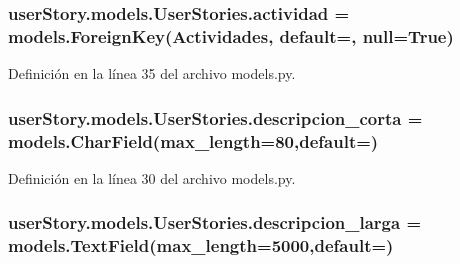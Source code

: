 \subsubsection[{\texorpdfstring{actividad}{actividad}}]{\setlength{\rightskip}{0pt plus 5cm}user\+Story.\+models.\+User\+Stories.\+actividad = models.\+Foreign\+Key({\bf Actividades}, default=\textquotesingle{}\textquotesingle{}, null=True)\hspace{0.3cm}{\ttfamily [static]}}\hypertarget{classuser_story_1_1models_1_1_user_stories_a589704713cc509199343a09d27f210e9}{}\label{classuser_story_1_1models_1_1_user_stories_a589704713cc509199343a09d27f210e9}


Definición en la línea 35 del archivo models.\+py.

\subsubsection[{\texorpdfstring{descripcion\+\_\+corta}{descripcion_corta}}]{\setlength{\rightskip}{0pt plus 5cm}user\+Story.\+models.\+User\+Stories.\+descripcion\+\_\+corta = models.\+Char\+Field(max\+\_\+length=80,default=\textquotesingle{}\textquotesingle{})\hspace{0.3cm}{\ttfamily [static]}}\hypertarget{classuser_story_1_1models_1_1_user_stories_a48ef4cf166f2feccd1728a8b68d89b7e}{}\label{classuser_story_1_1models_1_1_user_stories_a48ef4cf166f2feccd1728a8b68d89b7e}


Definición en la línea 30 del archivo models.\+py.

\subsubsection[{\texorpdfstring{descripcion\+\_\+larga}{descripcion_larga}}]{\setlength{\rightskip}{0pt plus 5cm}user\+Story.\+models.\+User\+Stories.\+descripcion\+\_\+larga = models.\+Text\+Field(max\+\_\+length=5000,default=\textquotesingle{}\textquotesingle{})\hspace{0.3cm}{\ttfamily [static]}}\hypertarget{classuser_story_1_1models_1_1_user_stories_a05d086050cb66bb31d2406622f964704}{}\label{classuser_story_1_1models_1_1_user_stories_a05d086050cb66bb31d2406622f964704}



